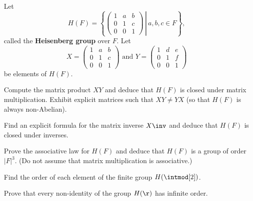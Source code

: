 \begin{exercise} \label{ex1.4.11}
    Let
    \[H(F) = \left\{\left.
    \begin{pmatrix}
        1 & a & b \\
        0 & 1 & c \\
        0 & 0 & 1
    \end{pmatrix}\,\right|\, a, b, c \in F\right\},\]
    called the \textbf{Heisenberg group} over $F$. Let
    \[X = 
    \begin{pmatrix}
        1 & a & b \\
        0 & 1 & c \\
        0 & 0 & 1
    \end{pmatrix} \text{ and }Y = 
    \begin{pmatrix}
        1 & d & e \\
        0 & 1 & f \\
        0 & 0 & 1
    \end{pmatrix}\]
    be elements of $H(F)$.
    \begin{subproblems}
        \item Compute the matrix product $XY$ and deduce that $H(F)$ is closed under matrix multiplication. Exhibit explicit matrices such that $XY \neq YX$ (so that $H(F)$ is always non-Abelian).
        \item Find an explicit formula for the matrix inverse $X\inv$ and deduce that $H(F)$ is closed under inverses.
        \item Prove the associative law for $H(F)$ and deduce that $H(F)$ is a group of order $|F|^3$. (Do not assume that matrix multiplication is associative.)
        \item Find the order of each element of the finite group $H(\intmod[2])$.
        
        \item Prove that every non-identity of the group $H(\r)$ has infinite order.
    \end{subproblems}
\end{exercise}

